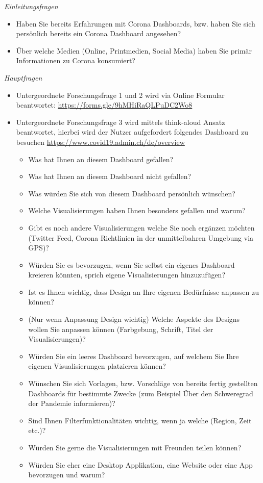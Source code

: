 \documentclass[12pt, oneside]{article}
\begin{document}
\textit{Einleitungsfragen}
\begin{itemize}
    \item Haben Sie bereits Erfahrungen mit Corona Dashboards, bzw. haben Sie sich persönlich bereits ein Corona Dashboard angesehen?
    \item Über welche Medien (Online, Printmedien, Social Media) haben Sie primär Informationen zu Corona konsumiert?
\end{itemize}

\textit{Hauptfragen}
\begin{itemize}
    \item Untergeordnete Forschungsfrage 1 und 2 wird via Online Formular beantwortet: \url{https://forms.gle/9hMHiRaQLPuDC2Wo8}
    \item Untergeordnete Forschungsfrage 3 wird mittels think-aloud Ansatz beantwortet, hierbei wird der Nutzer aufgefordert folgendes Dashboard zu besuchen \url{https://www.covid19.admin.ch/de/overview}
    \begin{itemize}
        \item Was hat Ihnen an diesem Dashboard gefallen?
        \item Was hat Ihnen an diesem Dashboard nicht gefallen?
        \item Was würden Sie sich von diesem Dashboard persönlich wünschen?
        \item Welche Visualisierungen haben Ihnen besonders gefallen und warum?
        \item Gibt es noch andere Visualisierungen welche Sie noch ergänzen möchten (Twitter Feed, Corona Richtlinien in der unmittelbahren Umgebung via GPS)?
        \item Würden Sie es bevorzugen, wenn Sie selbst ein eigenes Dashboard kreieren könnten, sprich eigene Visualisierungen hinzuzufügen?
        \item Ist es Ihnen wichtig, dass Design an Ihre eigenen Bedürfnisse anpassen zu können?
        \item (Nur wenn Anpassung Design wichtig) Welche Aspekte des Designs wollen Sie anpassen können (Farbgebung, Schrift, Titel der Visualisierungen)?
        \item Würden Sie ein leeres Dashboard bevorzugen, auf welchem Sie Ihre eigenen Visualisierungen platzieren können?
        \item Wünschen Sie sich Vorlagen, bzw. Vorschläge von bereits fertig gestellten Dashboards für bestimmte Zwecke (zum Beispiel Über den Schweregrad der Pandemie informieren)?
        \item Sind Ihnen Filterfunktionalitäten wichtig, wenn ja welche (Region, Zeit etc.)?
        \item Würden Sie gerne die Visualisierungen mit Freunden teilen können?
        \item Würden Sie eher eine Desktop Applikation, eine Website oder eine App bevorzugen und warum?
    \end{itemize}
\end{itemize}
\end{document}
